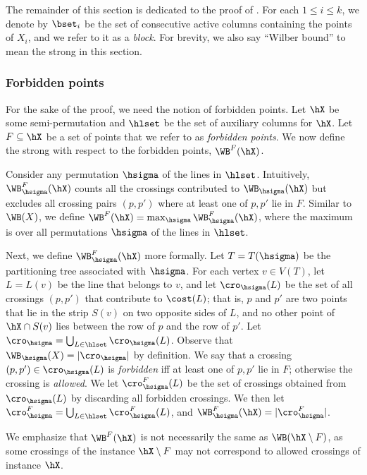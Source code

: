 The remainder of this section is dedicated to the proof of .
%
For each $1\leq i\leq k$, we denote by $\bset_i$ be the set of consecutive active columns containing the points of $X_i$, and we refer to it as a \emph{block}. For brevity, we also say ``Wilber bound'' to mean the strong \WBone in this section.

%
%
%
%
\subsubsection{Forbidden points}
%
%
%
%
For the sake of the proof, we need the notion of forbidden points.
Let $\hX$ be some semi-permutation and $\hlset$ be the set of auxiliary columns for $\hX$.
Let $F\subseteq \hX$ be a set of points that we refer to as \emph{forbidden points}.
We now define the strong \WBone with respect to the forbidden points, $\WB^F(\hX)$.

Consider any permutation $\hsigma$ of the lines in $\hlset$. 
Intuitively, $\WB_{\hsigma}^F(\hX)$ counts all the crossings contributed to $\WB_{\hsigma}(\hX)$ but excludes all crossing pairs $(p,p')$ where at least one of $p,p'$ lie in $F$.
Similar to $\WB(X)$, we define $\WB^F(\hX) = \max_{\hsigma} \WB_{\hsigma}^F(\hX)$, where the maximum is over all permutations $\hsigma$ of the lines in $\hlset$.

Next, we define $\WB_{\hsigma}^F(\hX)$ more formally. 
Let $T=T(\hsigma)$ be the partitioning tree associated with $\hsigma$.
For each vertex $v \in V(T)$, let $L = L(v)$ be the line that belongs to $v$, and 
let $\cro_{\hsigma}(L)$ be the set of all crossings $(p,p')$ that contribute to $\cost(L)$; 
that is, $p$ and $p'$ are two points that lie in the strip $S(v)$ on two opposite sides of $L$, and no other point of $\hX\cap S(v)$ lies between the row of $p$ and the row of $p'$.
Let $\cro_{\hsigma} = \bigcup_{L\in \hlset}\cro_{\hsigma}(L)$.
Observe that $\WB_{\hsigma}(X) = |\cro_{\hsigma}|$ by definition.
We say that a crossing $(p,p')\in \cro_{\hsigma}(L)$ is \emph{forbidden} iff at least one of $p,p'$ lie in $F$; otherwise the crossing is \emph{allowed}. We let $\cro^F_{\hsigma}(L)$ be the set of crossings obtained from $\cro_{\hsigma}(L)$ by discarding all forbidden crossings. We then let $\cro^F_{\hsigma}=\bigcup_{L\in \hlset}\cro^F_{\hsigma}(L)$, and $\WB^F_{\hsigma}(\hX)=|\cro^F_{\hsigma}|$.
%
%
%
%

We emphasize that $\WB^F(\hX)$ is not necessarily the same as $\WB(\hX\setminus F)$, as some crossings of the instance $\hX\setminus F$ may not correspond to allowed crossings of instance $\hX$.







